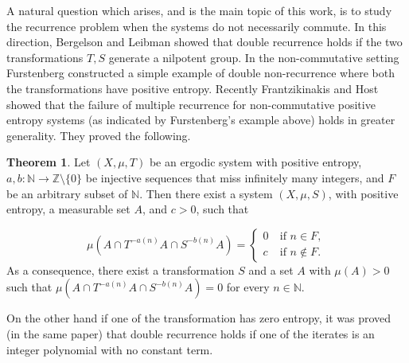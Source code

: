 \documentclass[12pt,reqno]{amsart}
\newcommand{\N}{\mathbb{N}}
\newcommand{\Z}{\mathbb{Z}}
\theoremstyle{definition}
\newtheorem*{thm*}{Theorem}
\begin{document}
A natural question which arises, and is the main topic of this work, is to study the recurrence problem when the systems do not necessarily commute. In this direction, Bergelson and Leibman \cite{Bergelson_Leibman_2002} showed that double recurrence holds if the two transformations $T,S$ generate a nilpotent group. %
In the non-commutative setting Furstenberg \cite[Chapter 2, page 40]{Furstenberg_1981} constructed a simple example of double non-recurrence where both the transformations have positive entropy. Recently Frantzikinakis and Host \cite{Frantzikinakis_Host_2023} showed that the failure of multiple recurrence for non-commutative positive entropy systems (as indicated by Furstenberg's example above) holds in greater generality. They proved the following. 

\begin{thm*}\cite[Proposition 1.4.]{Frantzikinakis_Host_2023} Let $(X, \mu, T)$ be an ergodic system with positive entropy, $a, b : \N \rightarrow
\Z \setminus \{0\}$ be injective sequences that miss infinitely many integers, and $F$ be an arbitrary
subset of $\N$. Then there exist a system $(X, \mu, S)$, with positive entropy, a measurable set
$A$, and $c > 0$, such that

\[
\mu\left(A\cap T^{-a(n)}A\cap S^{-b(n)}A\right) =\begin{cases}
0 &\ \text{if}\,\, n \in F,\\
c &\ \text{if}\,\, n \notin F.
\end{cases}
\] As a consequence, there exist a transformation $S$ and a set $A$ with $\mu(A)>0$ such that $\mu\left(A\cap T^{-a(n)}A\cap S^{-b(n)}A\right) = 0$ for every $n \in \N$. 
\end{thm*}

On the other hand if one of the transformation has zero entropy, it was proved (in the same paper) that double recurrence holds if one of the iterates is an integer polynomial with no constant term. 
\end{document}
